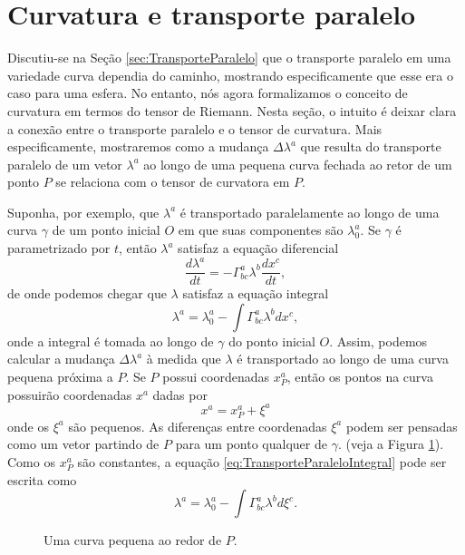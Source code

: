 \section{Curvatura e transporte paralelo}\label{sec:CurvaturaTransporteParalelo}

Discutiu-se na Seção \ref{sec:TransporteParalelo} que o transporte paralelo em uma variedade curva dependia do caminho, mostrando especificamente que esse era o caso para uma esfera. No entanto, nós agora formalizamos o conceito de curvatura em termos do tensor de Riemann. Nesta seção, o intuito é deixar clara a conexão entre o transporte paralelo e o tensor de curvatura. Mais especificamente, mostraremos como a mudança $\Delta\lambda^a$ que resulta do transporte paralelo de um vetor $\lambda^a$ ao longo de uma pequena curva fechada ao retor de um ponto $P$ se relaciona com o tensor de curvatora em $P$.

Suponha, por exemplo, que $\lambda^a$ é transportado paralelamente ao longo de uma curva $\gamma$ de um ponto inicial $O$ em que suas componentes são $\lambda_0^a$. Se $\gamma$ é parametrizado por $t$, então $\lambda^a$ satisfaz a equação diferencial
\begin{equation}\label{eq:TransporteParaleloDiferencial}
	\frac{d\lambda^a}{dt} = -\Gamma^a_{bc}\lambda^b\frac{dx^c}{dt},
\end{equation}
de onde podemos chegar que $\lambda$ satisfaz a equação integral
\begin{equation}\label{eq:TransporteParaleloIntegral}
	\lambda^a = \lambda^a_0 - \int\Gamma^a_{bc}\lambda^b dx^c,
\end{equation}
onde a integral é tomada ao longo de $\gamma$ do ponto inicial $O$. Assim, podemos calcular a mudança $\Delta\lambda^a$ à medida que $\lambda$ é transportado ao longo de uma curva pequena próxima a $P$. Se $P$ possui coordenadas $x^a_P$, então os pontos na curva possuirão coordenadas $x^a$ dadas por
\[
	x^a=x^a_P+\xi^a
\]
onde os $\xi^a$ são pequenos. As diferenças entre coordenadas $\xi^a$ podem ser pensadas como um vetor partindo de $P$ para um ponto qualquer de $\gamma$. (veja a Figura \ref{fig:SmallLoop}). Como os $x^a_P$ são constantes, a equação \eqref{eq:TransporteParaleloIntegral} pode ser escrita como
\begin{equation}\label{eq:TransporteParaleloIntegralXi}
	\lambda^a=\lambda^a_0 - \int\Gamma^a_{bc}\lambda^b d\xi^c .
\end{equation}

\begin{figure}[t]
	\centering
	\caption{Uma curva pequena ao redor de $P$.}
	\label{fig:SmallLoop}
\end{figure}

